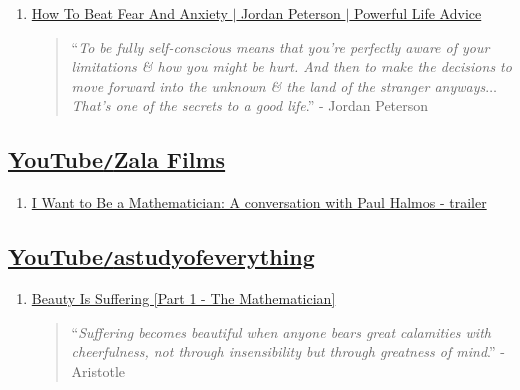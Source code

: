 \documentclass{article}
\begin{document}
\begin{enumerate}
	\begin{quotation}
		``{\it If you dare to do the most difficult thing that you can conceptualize, your life will work out better than it will if you do anything else}.'' - Jordan Peterson
	\end{quotation}
	\item \href{https://www.youtube.com/watch?v=bb9g9mtDHZo}{How To Beat Fear And Anxiety $|$ Jordan Peterson $|$ Powerful Life Advice}
	\begin{quotation}
		``{\it To be fully self-conscious means that you're perfectly aware of your limitations \& how you might be hurt. And then to make the decisions to move forward into the unknown \& the land of the stranger anyways$\ldots$ That's one of the secrets to a good life}.'' - Jordan Peterson
	\end{quotation}
\end{enumerate}


\subsection{\href{https://www.youtube.com/channel/UCrBsO0_kjefBUQPNgaELGGw}{YouTube{\tt/}Zala Films}}
\begin{enumerate}
	\item \href{https://www.youtube.com/watch?v=ONvYPldXoZs}{I Want to Be a Mathematician: A conversation with Paul Halmos - trailer}
\end{enumerate}


\subsection{\href{https://www.youtube.com/channel/UCDok3oTo2SSWZt6I8sHuzVg}{YouTube{\tt/}astudyofeverything}}
\begin{enumerate}
	\item \href{https://www.youtube.com/watch?v=i0UTeQfnzfM}{Beauty Is Suffering [Part 1 - The Mathematician]}
	\begin{quotation}
		``{\it Suffering becomes beautiful when anyone bears great calamities with cheerfulness, not through insensibility but through greatness of mind}.'' - Aristotle
	\end{quotation}
\end{enumerate}
\end{document}
